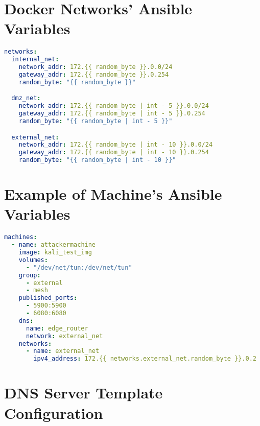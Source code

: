 \clearpage\thispagestyle{empty}\phantom{}\clearpage

\chapter{Docker Networks' Ansible Variables} \label{ap1:ansible_vars_docker_networks}

\begin{lstlisting}[language=yaml,caption=Ansible Variables - Docker Networks.]
networks:
  internal_net:
    network_addr: 172.{{ random_byte }}.0.0/24
    gateway_addr: 172.{{ random_byte }}.0.254
    random_byte: "{{ random_byte }}"

  dmz_net:
    network_addr: 172.{{ random_byte | int - 5 }}.0.0/24
    gateway_addr: 172.{{ random_byte | int - 5 }}.0.254
    random_byte: "{{ random_byte | int - 5 }}"

  external_net:
    network_addr: 172.{{ random_byte | int - 10 }}.0.0/24
    gateway_addr: 172.{{ random_byte | int - 10 }}.0.254
    random_byte: "{{ random_byte | int - 10 }}"
\end{lstlisting}


\blankpage

\chapter{Example of Machine's Ansible Variables} \label{ap1:ansible_vars_machine}

\begin{lstlisting}[language=yaml,caption=Ansible Variables - Machines.]
machines:
  - name: attackermachine
    image: kali_test_img
    volumes:
      - "/dev/net/tun:/dev/net/tun"
    group:
      - external
      - mesh
    published_ports:
      - 5900:5900
      - 6080:6080
    dns: 
      name: edge_router
      network: external_net
    networks:
      - name: external_net
        ipv4_address: 172.{{ networks.external_net.random_byte }}.0.2
\end{lstlisting}

\blankpage

\chapter{DNS Server Template Configuration} \label{ap1:ansible_vars_dns_template_conf}

